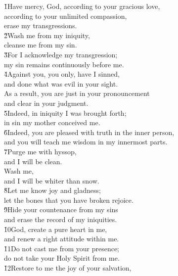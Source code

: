 \begin{poetry}
\poeml \v{1}Have mercy, God, according to your gracious love, \\
\poemll    according to your unlimited compassion, \\
\poemlll       erase my transgressions. \\
\poeml \v{2}Wash me from my iniquity, \\
\poemll    cleanse me from my sin. \\
\poeml \v{3}For I acknowledge my transgression; \\
\poemll    my sin remains continuously before me. \\
\poeml \v{4}Against you, you only, have I sinned, \\
\poemll    and done what was evil in your sight. \\
\poeml As a result, you are just in your pronouncement \\
\poemll    and clear in your judgment. \\
\poeml \v{5}Indeed, in iniquity I was brought forth; \\
\poemll    in sin my mother conceived me. \\
\poeml \v{6}Indeed, you are pleased with truth in the inner person, \\
\poemll    and you will teach me wisdom in my innermost parts. \\
\poeml \v{7}Purge me with hyssop, \\
\poemll    and I will be clean. \\
\poeml Wash me, \\
\poemll    and I will be whiter than snow. \\
\poeml \v{8}Let me know joy and gladness; \\
\poemll    let the bones that you have broken rejoice. \\
\poeml \v{9}Hide your countenance from my sins \\
\poemll    and erase the record of my iniquities. \\
\poeml \v{10}God, create a pure heart in me, \\
\poemll    and renew a right attitude within me. \\
\poeml \v{11}Do not cast me from your presence; \\
\poemll    do not take your Holy Spirit from me. \\
\poeml \v{12}Restore to me the joy of your salvation, \\

\end{poetry}
